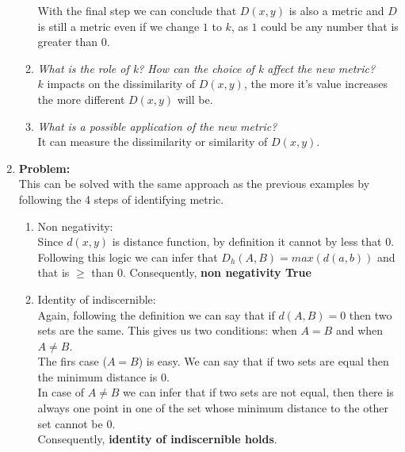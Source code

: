 \documentclass[11pt,a4paper,english]{article}
\begin{document}
\begin{enumerate}
\begin{enumerate}
                    \vspace{3mm}
                    With the final step we can conclude that $D(x, y)$ is also a metric and $D$ is still a metric even
                    if we change $1$ to $k$, as $1$ could be any number that is greater than $0$.

                \item \textit{What is the role of k? How can the choice of k affect the new metric?}\\
                    $k$ impacts on the dissimilarity of $D(x,y)$, the more it's value increases the more
                    different $D(x,y)$ will be.
                \item \textit{What is a possible application of the new metric?}\\
                    It can measure the dissimilarity or similarity of $D(x,y)$.
            \end{enumerate}

        \item \textbf{Problem:} \textit{}\\
            This can be solved with the same approach as the previous examples by following
            the 4 steps of identifying metric.
            \begin{enumerate}
                \item Non negativity:\\
                    Since $d(x,y)$ is distance function, by definition it cannot by less that $0$. Following this logic
                    we can infer that $D_h(A,B)=max(d(a,b))$ and that is $\geqslant$ than $0$. Consequently,
                    \textbf{non negativity True}

                \item Identity of indiscernible:\\
                    Again, following the definition we can say that if $d(A,B)=0$ then two sets are the same. This gives
                    us two conditions: when $A=B$ and when $A\neq B$.\\
                    The firs case ($A=B$) is easy. We can say that if two sets are equal then the minimum distance is
                    $0$.\\
                    In case of $A\neq B$ we can infer that if two sets are not equal, then there is always one point
                    in one of the set whose minimum distance to the other set cannot be 0. \\
                    Consequently, \textbf{identity of indiscernible holds}.


\end{enumerate}
\end{enumerate}
\end{document}
